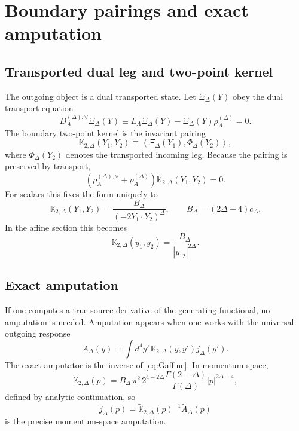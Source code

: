 \documentclass[11pt]{article}
\begin{document}
\section{Boundary pairings and exact amputation}

\subsection{Transported dual leg and two-point kernel}

The outgoing object is a dual transported state. Let $\Xi_\Delta(Y)$ obey the dual transport equation
\begin{equation}
D_A^{(\Delta),\vee}\Xi_\Delta(Y)
\equiv
L_A \Xi_\Delta(Y)-\Xi_\Delta(Y)\rho_A^{(\Delta)}=0.
\label{eq:dualtransport}
\end{equation}
The boundary two-point kernel is the invariant pairing
\begin{equation}
\mathbb{K}_{2,\Delta}(Y_1,Y_2)
\equiv
\left\langle
\Xi_\Delta(Y_1),\Phi_\Delta(Y_2)
\right\rangle,
\label{eq:K2def}
\end{equation}
where $\Phi_\Delta(Y_2)$ denotes the transported incoming leg. Because the pairing is preserved by transport,
\begin{equation}
\left(\rho_A^{(\Delta),\vee}+\rho_A^{(\Delta)}\right)\mathbb{K}_{2,\Delta}(Y_1,Y_2)=0.
\label{eq:K2inv}
\end{equation}
For scalars this fixes the form uniquely to
\begin{equation}
\mathbb{K}_{2,\Delta}(Y_1,Y_2)
=
\frac{B_\Delta}{(-2Y_1\cdot Y_2)^\Delta},
\qquad
B_\Delta=(2\Delta-4)c_\Delta.
\label{eq:GDelta}
\end{equation}
In the affine section this becomes
\begin{equation}
\mathbb{K}_{2,\Delta}(y_1,y_2)=\frac{B_\Delta}{|y_{12}|^{2\Delta}}.
\label{eq:Gaffine}
\end{equation}

\subsection{Exact amputation}

If one computes a true source derivative of the generating functional, no amputation is needed. Amputation appears when one works with the universal outgoing response
\begin{equation}
A_\Delta(y)=\int d^4y'\,\mathbb{K}_{2,\Delta}(y,y')j_\Delta(y').
\label{eq:response}
\end{equation}
The exact amputator is the inverse of \cref{eq:Gaffine}. In momentum space,
\begin{equation}
\widetilde{\mathbb{K}}_{2,\Delta}(p)
=
B_\Delta\,\pi^2\,2^{4-2\Delta}
\frac{\Gamma(2-\Delta)}{\Gamma(\Delta)}
|p|^{2\Delta-4},
\label{eq:Gmom}
\end{equation}
defined by analytic continuation, so
\begin{equation}
\widetilde{j}_\Delta(p)
=
\widetilde{\mathbb{K}}_{2,\Delta}(p)^{-1}\widetilde{A}_\Delta(p)
\label{eq:amputmom}
\end{equation}
is the precise momentum-space amputation.
\end{document}
